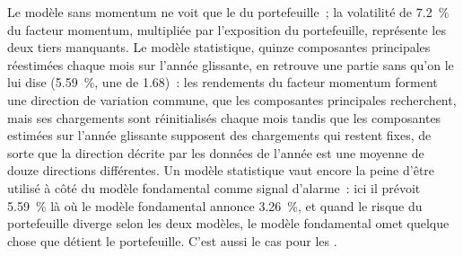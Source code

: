 Le modèle sans momentum ne voit que le  du portefeuille~; la volatilité de 7.2~\% du facteur momentum, multipliée par l'exposition du portefeuille, représente
les deux tiers manquants. Le modèle statistique, quinze composantes principales réestimées chaque mois sur l'année glissante, en retrouve une partie sans qu'on le lui dise (5.59~\%, une 
de 1.68)~: les rendements du facteur momentum forment une direction de variation commune, que les composantes principales recherchent, mais ses chargements sont réinitialisés chaque mois
tandis que les composantes estimées sur l'année glissante supposent des chargements qui restent fixes, de sorte que la direction décrite par les données de l'année est une moyenne de douze directions différentes. Un
modèle statistique vaut encore la peine d'être utilisé à côté du modèle fondamental comme signal d'alarme~: ici il prévoit 5.59~\% là où le modèle fondamental annonce 3.26~\%, et quand le
risque du portefeuille diverge selon les deux modèles, le modèle fondamental omet quelque chose que détient le portefeuille. C'est aussi le cas pour les .

